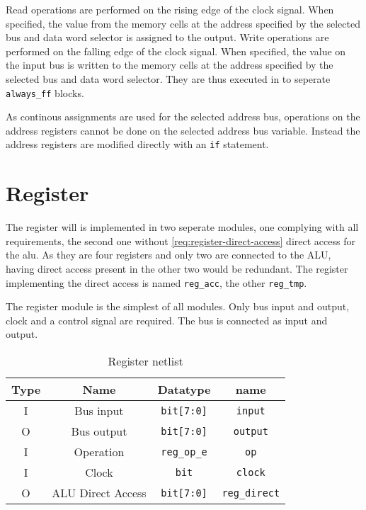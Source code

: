Read operations are performed on the rising edge of the clock signal. When specified, the value from the memory cells at the address specified by the selected bus and data word selector is assigned to the output. Write operations are performed on the falling edge of the clock signal. When specified, the value on the input bus is written to the memory cells at the address specified by the selected bus and data word selector. They are thus executed in to seperate \texttt{always\_ff} blocks.

As continous assignments are used for the selected address bus, operations on the address registers cannot be done on the selected address bus variable. Instead the address registers are modified directly with an \texttt{if} statement.


\section{Register}
The register will is implemented in two seperate modules, one complying with all requirements, the second one without \ref{req:register-direct-access} direct access for the alu. As they are four registers and only two are connected to the ALU, having direct access present in the other two would be redundant. The register implementing the direct access is named \texttt{reg\_acc}, the other \texttt{reg\_tmp}.

The register module is the simplest of all modules. Only bus input and output, clock and a control signal are required. The bus is connected as input and output.

\begin{table}[H]
  
  \begin{center}
  \begin{tabular}{cccc}
   Type & Name               & Datatype                       & name                          \\ \hline
   I    & Bus input          & \texttt{bit{[}7:0{]}}          & \texttt{input}                \\
   O    & Bus output         & \texttt{bit{[}7:0{]}}          & \texttt{output}               \\
   I    & Operation          & \texttt{reg\_op\_e}         & \texttt{op}                   \\
   I    & Clock              & \texttt{bit}                   & \texttt{clock}               \\
   O    & ALU Direct Access               & \texttt{bit{[}7:0{]}}          & \texttt{reg\_direct}               \\
   \end{tabular}
  \end{center}
   \caption{Register netlist}
   \label{tab:reg-io}
\end{table}

